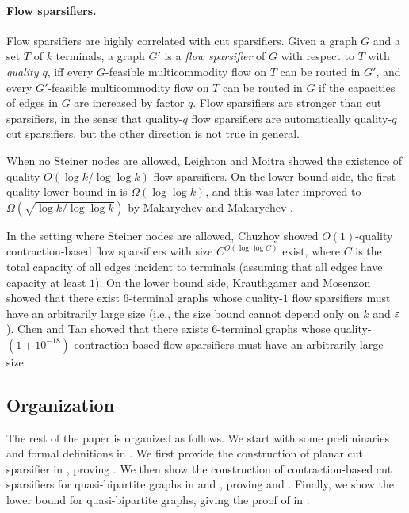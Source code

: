 \paragraph{Flow sparsifiers.}
Flow sparsifiers are highly correlated with cut sparsifiers.
Given a graph $G$ and a set $T$ of $k$ terminals, a graph $G'$ is a \emph{flow sparsifier} of $G$ with respect to $T$ with \emph{quality $q$}, iff every $G$-feasible multicommodity flow on $T$ can be routed in $G'$, and every $G'$-feasible multicommodity flow on $T$ can be routed in $G$ if the capacities of edges in $G$ are increased by factor $q$. Flow sparsifiers are stronger than cut sparsifiers, in the sense that quality-$q$ flow sparsifiers are automatically quality-$q$ cut sparsifiers, but the other direction is not true in general.

When no Steiner nodes are allowed,
Leighton and Moitra \cite{leighton2010extensions} showed the existence of quality-$O(\log k/\log\log k)$ flow sparsifiers. 
On the lower bound side, the first quality lower bound in \cite{leighton2010extensions} is $\Omega(\log\log k)$, and this was later improved to $\Omega(\sqrt{\log k/\log\log k})$ by Makarychev and Makarychev \cite{makarychev2010metric}.


In the setting where Steiner nodes are allowed,
Chuzhoy \cite{chuzhoy2012vertex} showed $O(1)$-quality contraction-based flow sparsifiers with size $C^{O(\log\log C)}$ exist, where $C$ is the total capacity of all edges incident to terminals (assuming that all edges have capacity at least $1$).
On the lower bound side, Krauthgamer and Mosenzon \cite{krauthgamer2023exact} showed that there exist $6$-terminal graphs whose quality-$1$ flow sparsifiers must have an arbitrarily large size (i.e., the size bound cannot depend only on $k$ and ${\varepsilon}$). Chen and Tan \cite{chen20241+} showed that there exists $6$-terminal graphs whose quality-$(1+10^{-18})$ contraction-based flow sparsifiers must have an arbitrarily large size.


\subsection{Organization}
The rest of the paper is organized as follows. We start with some preliminaries and formal definitions in .
We first provide the construction of planar cut sparsifier in , proving . We then show the construction of contraction-based cut sparsifiers for quasi-bipartite graphs in  and , proving  and . Finally, we show the lower bound for quasi-bipartite graphs, giving the proof of  in .










